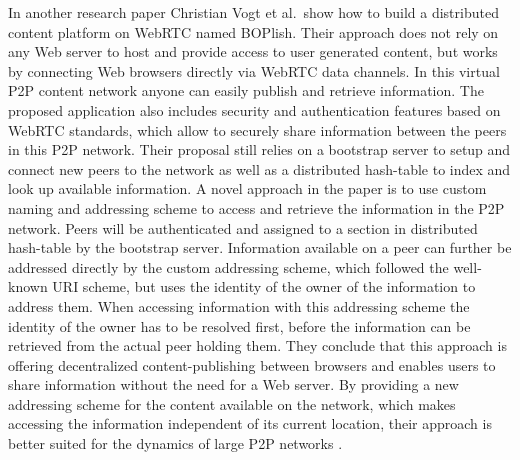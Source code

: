 In another research paper Christian Vogt et al.\ show how to build a distributed content platform on \gls{WebRTC} named BOPlish. Their approach does not rely on any Web server to host and provide access to user generated content, but works by connecting Web browsers directly via \gls{WebRTC} data channels. In this virtual \gls{P2P} content network anyone can easily publish and retrieve information. The proposed application also includes security and authentication features based on \gls{WebRTC} standards, which allow to securely share information between the peers in this \gls{P2P} network. Their proposal still relies on a bootstrap server to setup and connect new peers to the network as well as a distributed hash-table to index and look up available information. A novel approach in the paper is to use custom naming and addressing scheme to access and retrieve the information in the \gls{P2P} network. Peers will be authenticated and assigned to a section in distributed hash-table by the bootstrap server. Information available on a peer can further be addressed directly by the custom addressing scheme, which followed the well-known \gls{URI} scheme, but uses the identity of the owner of the information to address them. When accessing information with this addressing scheme the identity of the owner has to be resolved first, before the information can be retrieved from the actual peer holding them. They conclude that this approach is offering decentralized content-publishing between browsers and enables users to share information without the need for a Web server. By providing a new addressing scheme for the content available on the network, which makes accessing the information independent of its current location, their approach is better suited for the dynamics of large \gls{P2P} networks \citep{vogt2013content}. \\

